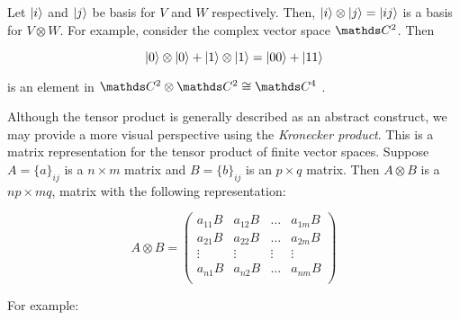 Let $|i\rangle$ and $|j\rangle$ be basis for $V$ and $W$ respectively. Then, $|i\rangle \otimes |j\rangle = |ij\rangle$ is a basis for $V \otimes W$. For example, consider the complex vector space $\C^2$. Then

$$ |0\rangle \otimes |0\rangle + |1\rangle \otimes |1\rangle = |00\rangle + |11\rangle $$

is an element in $\C^2 \otimes \C^2 \cong \C^4$ .

Although the tensor product is generally described as an abstract construct, we may provide a more visual perspective using the \emph{Kronecker product}. This is a matrix representation for the tensor product of finite vector spaces. Suppose $A = \{a\}_{ij}$ is a $n \times m$ matrix and $B = \{b\}_{ij}$ is an $p \times q$ matrix. Then $A \otimes B$ is a $np \times mq$, matrix with the following representation:

$$ A \otimes B = 
\begin{pmatrix}
	a_{11}B & a_{12}B & \dotsc & a_{1m}B \\
	a_{21}B & a_{22}B & \dotsc & a_{2m}B \\
	\vdots & \vdots & \vdots & \vdots \\
	a_{n1}B & a_{n2}B & \dotsc & a_{nm}B \\
\end{pmatrix}
$$

For example:

